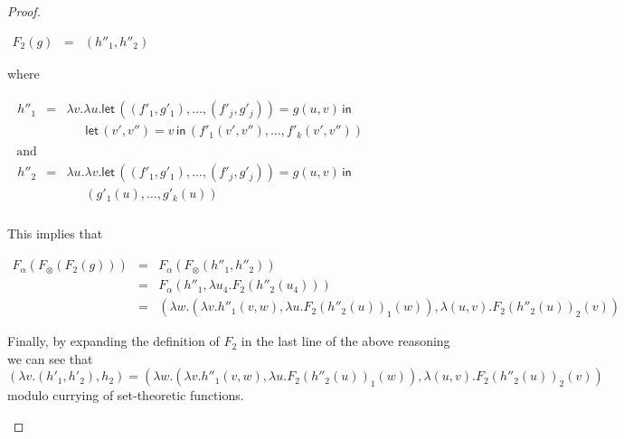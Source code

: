 \begin{proof}
\begin{report}
\begin{center}
\begin{itemize}
\begin{center}
\begin{math}
\begin{array}{lll}
            F_2(g) & = & (h''_1,h''_2)
          \end{array}
        \end{math}
      \end{center}
      where
      \begin{center}
        \begin{math}
          \begin{array}{lll}
            \begin{array}{lll}
              h''_1 & = & \lambda v.\lambda u.\mathsf{let}\,((f'_1,g'_1),\ldots,(f'_j,g'_j)) = g(u,v)\,\mathsf{in}\\
              & & \,\,\,\,\,\,\,\,\,\mathsf{let}\,(v',v'') = v\,\mathsf{in}\,(f'_1(v',v''),\ldots,f'_k(v',v''))
              
            \end{array}\\
            \text{ and }\\
            \begin{array}{lll}
              h''_2 & = & \lambda u.\lambda v.\mathsf{let}\,((f'_1,g'_1),\ldots,(f'_j,g'_j)) = g(u,v)\,\mathsf{in}\\
              & & \,\,\,\,\,\,\,\,\,(g'_1(u),\ldots,g'_k(u))\\
            \end{array}
          \end{array}
        \end{math}
      \end{center}
      This implies that
      \begin{center}
        \begin{math}
          \begin{array}{lll}
            F_\alpha(F_\otimes(F_2(g)))
            & = & F_\alpha(F_\otimes(h''_1,h''_2))\\
            & = & F_\alpha(h''_1,\lambda u_4.F_2(h''_2(u_4)))\\
            & = & (\lambda w.(\lambda v.h''_1(v,w),\lambda u.F_2(h''_2(u))_1(w)),\lambda (u,v).F_2(h''_2(u))_2(v))
          \end{array}
        \end{math}
      \end{center}
      Finally, by expanding the definition of $F_2$ in the last line
      of the above reasoning we can see that
      \[ (\lambda v.(h'_1,h'_2),h_2) = (\lambda w.(\lambda v.h''_1(v,w),\lambda u.F_2(h''_2(u))_1(w)),\lambda (u,v).F_2(h''_2(u))_2(v)) \]
      modulo currying of set-theoretic functions.


\end{itemize}
\end{center}
\end{report}
\end{proof}
